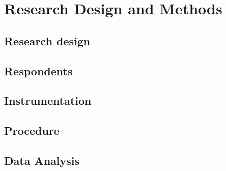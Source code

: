 \chapter{Research Design and Methods}

\section{Research design}


\section{Respondents}


\section{Instrumentation}


\section{Procedure}


\section{Data Analysis}


